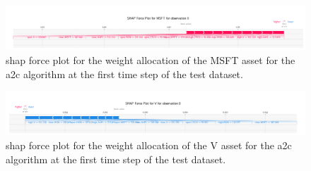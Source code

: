 \begin{figure}
    \centering
    \includegraphics[width=\textwidth]{figures/a2c_shap_forceplot_singleobs_msft.png}
    \caption{\acrshort{shap} force plot for the weight allocation of the MSFT asset for the \acrshort{a2c} algorithm at the first time step of the test dataset.}
    \label{fig:a2c_shap_forceplot_singleobs_msft}
\end{figure}

\begin{figure}
    \centering
    \includegraphics[width=\textwidth]{figures/a2c_shap_forceplot_singleobs_v.png}
    \caption{\acrshort{shap} force plot for the weight allocation of the V asset for the \acrshort{a2c} algorithm at the first time step of the test dataset.}
    \label{fig:a2c_shap_forceplot_singleobs_v}
\end{figure}